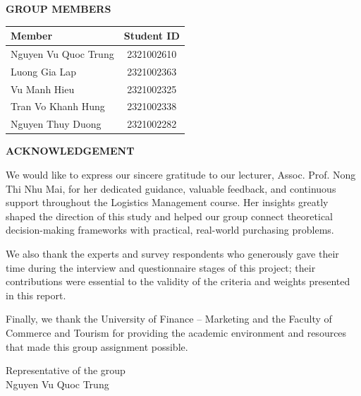 \thispagestyle{empty}
\begin{center}
{\bfseries\Large GROUP MEMBERS\par}
\end{center}
\vspace{1.5cm}
\begin{center}
{\renewcommand{\arraystretch}{2.0}\setlength{\tabcolsep}{28pt}
\begin{tabular}{l c}
\toprule
\textbf{Member} & \textbf{Student ID} \\
\midrule
Nguyen Vu Quoc Trung & 2321002610 \\
Luong Gia Lap & 2321002363 \\
Vu Manh Hieu & 2321002325 \\
Tran Vo Khanh Hung & 2321002338 \\
Nguyen Thuy Duong & 2321002282 \\
\bottomrule
\end{tabular}}
\end{center}
\clearpage

\thispagestyle{empty}
\begin{center}
{\bfseries\Large ACKNOWLEDGEMENT\par}
\end{center}
\vspace{1.5cm}
\noindent
We would like to express our sincere gratitude to our lecturer, Assoc. Prof. Nong Thi Nhu Mai,
for her dedicated guidance, valuable feedback, and continuous support throughout the Logistics
Management course. Her insights greatly shaped the direction of this study and helped our group
connect theoretical decision-making frameworks with practical, real-world purchasing problems.

\vspace{1em}
\noindent
We also thank the experts and survey respondents who generously gave their time during the
interview and questionnaire stages of this project; their contributions were essential to the
validity of the criteria and weights presented in this report.

\vspace{1em}
\noindent
Finally, we thank the University of Finance -- Marketing and the Faculty of Commerce and Tourism
for providing the academic environment and resources that made this group assignment possible.

\vspace{2em}
\begin{flushright}
Representative of the group\\[1\baselineskip]
Nguyen Vu Quoc Trung
\clearpage
\end{flushright}

